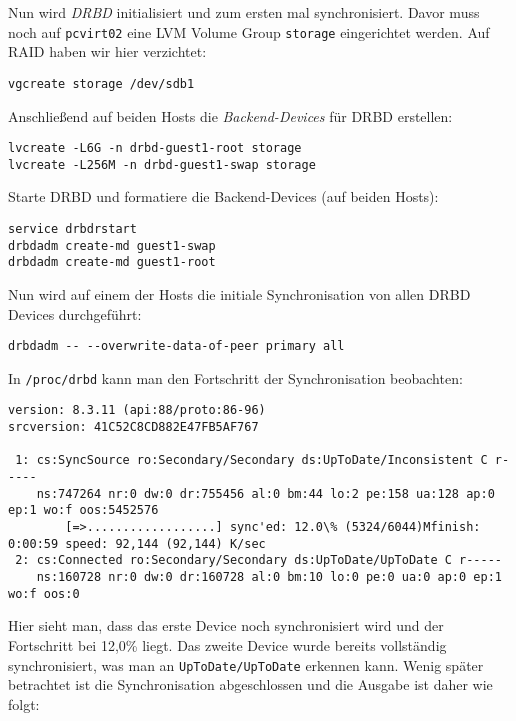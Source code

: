 Nun wird \emph{DRBD} initialisiert und zum ersten mal synchronisiert. Davor muss noch auf \verb#pcvirt02# eine LVM Volume Group \verb#storage# eingerichtet werden. Auf RAID haben wir hier verzichtet:

\setupVerbatimOut
\begin{verbatim}
vgcreate storage /dev/sdb1 
\end{verbatim}

Anschließend auf beiden Hosts die \emph{Backend-Devices} für DRBD erstellen:
\setupVerbatimOut
\begin{verbatim}
lvcreate -L6G -n drbd-guest1-root storage
lvcreate -L256M -n drbd-guest1-swap storage
\end{verbatim}

Starte DRBD und formatiere die Backend-Devices (auf beiden Hosts):

\setupVerbatimOut
\begin{verbatim}
service drbdrstart
drbdadm create-md guest1-swap
drbdadm create-md guest1-root
\end{verbatim}


Nun wird auf einem der Hosts die initiale Synchronisation von allen DRBD Devices durchgeführt:

\setupVerbatimOut
\begin{verbatim}
drbdadm -- --overwrite-data-of-peer primary all
\end{verbatim}
In \verb#/proc/drbd# kann man den Fortschritt der Synchronisation beobachten:


\setupVerbatimOut
\begin{verbatim}
version: 8.3.11 (api:88/proto:86-96)
srcversion: 41C52C8CD882E47FB5AF767 

 1: cs:SyncSource ro:Secondary/Secondary ds:UpToDate/Inconsistent C r-----
    ns:747264 nr:0 dw:0 dr:755456 al:0 bm:44 lo:2 pe:158 ua:128 ap:0 ep:1 wo:f oos:5452576
        [=>..................] sync'ed: 12.0\% (5324/6044)Mfinish: 0:00:59 speed: 92,144 (92,144) K/sec
 2: cs:Connected ro:Secondary/Secondary ds:UpToDate/UpToDate C r-----
    ns:160728 nr:0 dw:0 dr:160728 al:0 bm:10 lo:0 pe:0 ua:0 ap:0 ep:1 wo:f oos:0
\end{verbatim}
Hier sieht man, dass das erste Device noch synchronisiert wird und der Fortschritt bei 12,0\% liegt. Das zweite Device wurde bereits vollständig synchronisiert, was man an \verb#UpToDate/UpToDate# erkennen kann.
Wenig später betrachtet ist die Synchronisation abgeschlossen und die Ausgabe ist daher wie folgt:

